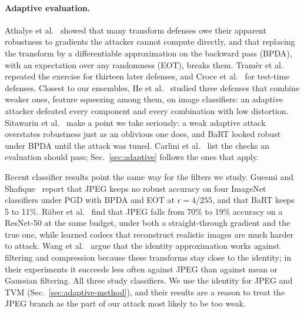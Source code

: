 \documentclass[11pt]{article}
\begin{document}
\paragraph{Adaptive evaluation.}
Athalye et al.~\cite{athalye2018obfuscated} showed that many transform
defenses owe their apparent robustness to gradients the attacker cannot
compute directly, and that replacing the transform by a differentiable
approximation on the backward pass (BPDA), with an expectation over any
randomness (EOT), breaks them. Tram\`er et al.~\cite{tramer2020adaptive}
repeated the exercise for thirteen later defenses, and Croce et
al.~\cite{croce2022evaluating} for test-time defenses. Closest to our
ensembles, He et al.~\cite{he2017ensembles} studied three defenses that
combine weaker ones, feature squeezing among them, on image classifiers: an
adaptive attacker defeated every component and every combination with low
distortion.
Sitawarin et al.~\cite{sitawarin2022demystifying} make a point we take
seriously: a weak adaptive attack overstates robustness just as an oblivious
one does, and BaRT looked robust under BPDA until the attack was tuned.
Carlini et al.~\cite{carlini2019evaluating} list the checks an evaluation
should pass; Sec.~\ref{sec:adaptive} follows the ones that apply.

Recent classifier results point the same way for the filters we study.
Guesmi and Shafique~\cite{guesmi2025drift} report that JPEG keeps no robust
accuracy on four ImageNet classifiers under PGD with BPDA and EOT at
$\epsilon=4/255$, and that BaRT keeps 5 to 11\%. R\"aber et
al.~\cite{raber2025keep} find that JPEG falls from 70\% to 19\% accuracy on
a ResNet-50 at the same budget, under both a straight-through gradient and
the true one, while learned codecs that reconstruct realistic images are
much harder to attack. Wang et al.~\cite{wang2026shared} argue that the
identity approximation works against filtering and compression because these
transforms stay close to the identity; in their experiments it succeeds less
often against JPEG than against mean or Gaussian filtering. All three study
classifiers. We use the identity for JPEG and TVM
(Sec.~\ref{sec:adaptive-method}), and their results are a reason to treat
the JPEG branch as the part of our attack most likely to be too weak.
\end{document}
